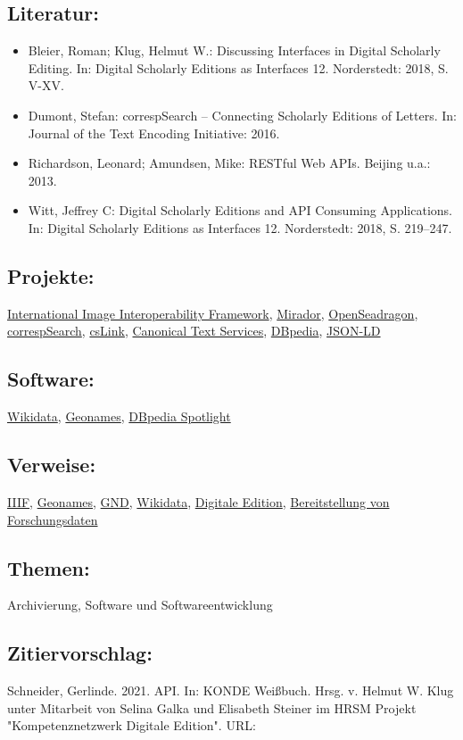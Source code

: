 \documentclass{article}
\begin{document}
        \subsection*{Literatur:}\begin{itemize}\item Bleier, Roman; Klug, Helmut W.: Discussing Interfaces in Digital Scholarly Editing. In: Digital Scholarly Editions as Interfaces 12. Norderstedt: 2018, S. V-XV.\item Dumont, Stefan: correspSearch – Connecting Scholarly Editions of Letters. In: Journal of the Text Encoding Initiative: 2016.\item Richardson, Leonard; Amundsen, Mike: RESTful Web APIs. Beijing u.a.: 2013.\item Witt, Jeffrey C: Digital Scholarly Editions and API Consuming Applications. In: Digital Scholarly Editions as Interfaces 12. Norderstedt: 2018, S. 219–247.\end{itemize}\subsection*{Projekte:}\href{https://iiif.io}{International Image Interoperability Framework}, \href{https://projectmirador.org}{Mirador}, \href{https://openseadragon.github.io}{OpenSeadragon}, \href{https://correspsearch.net}{correspSearch}, \href{https://github.com/correspSearch/csLink}{csLink}, \href{http://cite-architecture.github.io/cts_spec/specification.html#cts}{Canonical Text Services}, \href{https://wiki.dbpedia.org}{DBpedia}, \href{https://json-ld.org/}{JSON-LD}\subsection*{Software:}\href{https://www.wikidata.org/wiki/Wikidata:Main_Page}{Wikidata}, \href{geonames.org}{Geonames}, \href{https://github.com/dbpedia-spotlight/dbpedia-spotlight/wiki}{DBpedia Spotlight}\subsection*{Verweise:}\href{https://gams.uni-graz.at/o:konde.123}{IIIF}, \href{https://gams.uni-graz.at/o:konde.107}{Geonames}, \href{https://gams.uni-graz.at/o:konde.109}{GND}, \href{https://gams.uni-graz.at/o:konde.112}{Wikidata}, \href{https://gams.uni-graz.at/o:konde.59}{Digitale Edition}, \href{https://gams.uni-graz.at/o:konde.87}{Bereitstellung von Forschungsdaten}\subsection*{Themen:}Archivierung, Software und Softwareentwicklung\subsection*{Zitiervorschlag:}Schneider, Gerlinde. 2021. API. In: KONDE Weißbuch. Hrsg. v. Helmut W. Klug unter Mitarbeit von Selina Galka und Elisabeth Steiner im HRSM Projekt "Kompetenznetzwerk Digitale Edition". URL: 
\end{document}
